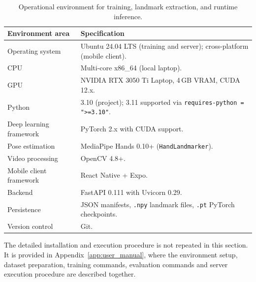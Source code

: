 \begin{table}[H]
    \centering
    \small
    \renewcommand{\arraystretch}{1.25}
    \caption{Operational environment for training, landmark extraction, and runtime inference.}
    \label{tab:operational_environment}
    \begin{tabular}{@{}p{4.2cm} p{9.0cm}@{}}
        \toprule
        \textbf{Environment area} & \textbf{Specification}                                                          \\
        \midrule
        Operating system          & Ubuntu 24.04 LTS (training and server); cross-platform (mobile client).         \\
        CPU                       & Multi-core x86\_64 (local laptop).                                              \\
        GPU                       & NVIDIA RTX 3050 Ti Laptop, 4\,GB VRAM, CUDA 12.x.                               \\
        Python                    & 3.10 (project); 3.11 supported via \texttt{requires-python = ">=3.10"}.         \\
        Deep learning framework   & PyTorch 2.x with CUDA support.                                                  \\
        Pose estimation           & MediaPipe Hands 0.10+ (\texttt{HandLandmarker}).                                \\
        Video processing          & OpenCV 4.8+.                                                                    \\
        Mobile client framework   & React Native + Expo.                                                            \\
        Backend                   & FastAPI 0.111 with Uvicorn 0.29.                                                \\
        Persistence               & JSON manifests, \texttt{.npy} landmark files, \texttt{.pt} PyTorch checkpoints. \\
        Version control           & Git.                                                                            \\
        \bottomrule
    \end{tabular}
\end{table}

The detailed installation and execution procedure is not repeated in this section. It is provided
in Appendix~\ref{app:user_manual}, where the environment setup, dataset preparation, training
commands, evaluation commands and server execution procedure are described together.

